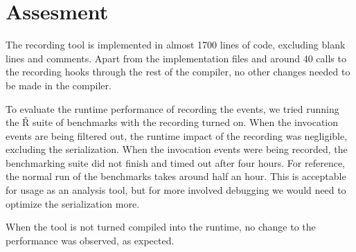 \section{Assesment}

The recording tool is implemented in almost 1700 lines of code, excluding blank lines and comments. Apart from the implementation files and around 40 calls to the recording hooks through the rest of the compiler, no other changes needed to be made in the compiler.

To evaluate the runtime performance of recording the events, we tried running the Ř suite of benchmarks with the recording turned on. When the invocation events are being filtered out, the runtime impact of the recording was negligible, excluding the serialization. When the invocation events were being recorded, the benchmarking suite did not finish and timed out after four hours. For reference, the normal run of the benchmarks takes around half an hour. This is acceptable for usage as an analysis tool, but for more involved debugging we would need to optimize the serialization more.

When the tool is not turned compiled into the runtime, no change to the performance was observed, as expected.

